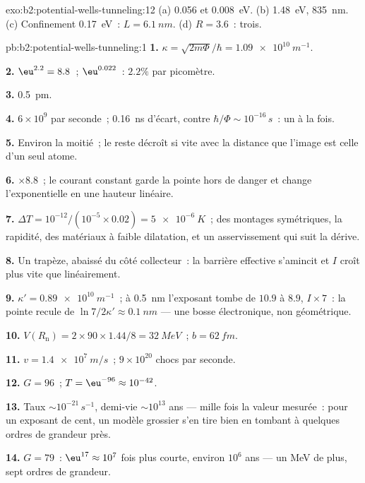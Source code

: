 \begin{solution}{exo:b2:potential-wells-tunneling:12}
(a) \qty{0.056}{} et \qty{0.008}{eV}. (b) \qty{1.48}{eV}, \qty{835}{nm}. (c) Confinement
\qty{0.17}{eV}~: $L = \qty{6.1}{nm}$. (d) $R = 3.6$~: trois.
\end{solution}

\begin{solution}{pb:b2:potential-wells-tunneling:1}
\textbf{1.} $\kappa = \sqrt{2m\Phi}/\hbar = \qty{1.09e10}{m^{-1}}$.

\textbf{2.} $\eu^{2.2} = 8.8$~; $\eu^{0.022}$~: $2.2\%$ par picomètre.

\textbf{3.} \qty{0.5}{pm}.

\textbf{4.} $6 \times 10^9$ par seconde~; \qty{0.16}{ns} d'écart, contre $\hbar/\Phi
\sim 10^{-16}\,\unit{s}$~: un à la fois.

\textbf{5.} Environ la moitié~; le reste décroît si vite avec la distance que
l'image est celle d'un seul atome.

\textbf{6.} $\times 8.8$~; le courant constant garde la pointe hors de danger et change
l'exponentielle en une hauteur linéaire.

\textbf{7.} $\Delta T = 10^{-12}/(10^{-5} \times 0.02) = \qty{5e-6}{K}$~; des montages
symétriques, la rapidité, des matériaux à faible dilatation, et un asservissement qui suit la
dérive.

\textbf{8.} Un trapèze, abaissé du côté collecteur~: la barrière
effective s'amincit et $I$ croît plus vite que linéairement.

\textbf{9.} $\kappa' = \qty{0.89e10}{m^{-1}}$~; à \qty{0.5}{nm} l'exposant tombe de
$10.9$ à $8.9$, $I \times 7$~: la pointe recule de $\ln 7/2\kappa' \approx \qty{0.1}{nm}$
--- une bosse électronique, non géométrique.

\textbf{10.} $V(R_{\text{n}}) = 2 \times 90 \times 1.44/8 = \qty{32}{MeV}$~; $b = \qty{62}{fm}$.

\textbf{11.} $v = \qty{1.4e7}{m/s}$~; $9 \times 10^{20}$ chocs par seconde.

\textbf{12.} $G = 96$~; $T = \eu^{-96} \approx 10^{-42}$.

\textbf{13.} Taux $\sim 10^{-21}\,\unit{s^{-1}}$, demi-vie $\sim 10^{13}$ ans --- mille
fois la valeur mesurée~: pour un exposant de cent, un modèle
grossier s'en tire bien en tombant à quelques ordres de grandeur près.

\textbf{14.} $G = 79$~: $\eu^{17} \approx 10^7$ fois plus courte, environ $10^6$ ans ---
un MeV de plus, sept ordres de grandeur.


\end{solution}

